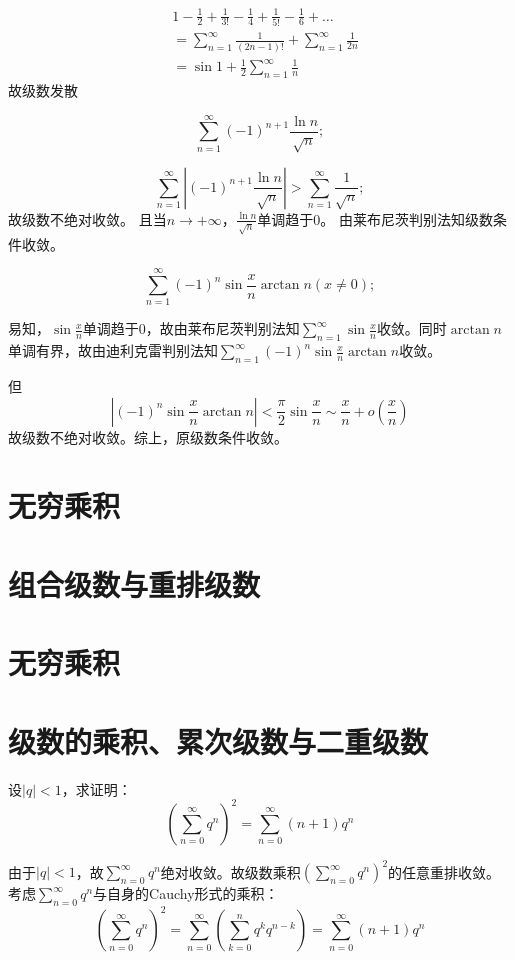 \begin{align*}
    & 1 - \frac{1}{2} + \frac{1}{3!} - \frac{1}{4} + \frac{1}{5!} -
    \frac{1}{6} + \dots
    \\
    & = \sum_{n=1}^{\infty} \frac{1}{(2n-1)!} + \sum_{n=1}^{\infty}
    \frac{1}{2n}
    \\ &= \sin 1 + \frac{1}{2} \sum_{n=1}^{\infty} \frac{1}{n}
\end{align*}
故级数发散

\[
    \sum_{n=1}^{\infty} (-1)^{n+1} \frac{\ln n}{\sqrt{n}};
\]

\[
    \sum_{n=1}^{\infty} \left| (-1)^{n+1} \frac{\ln
    n}{\sqrt{n}} \right|
    > \sum_{n=1}^{\infty} \frac{1}{\sqrt{n}} ;
\]
故级数不绝对收敛。
且当\(n \to + \infty\)，\(\frac{\ln n}{\sqrt{n}}\)单调趋于0。
由莱布尼茨判别法知级数条件收敛。

\[
    \sum_{n=1}^{\infty} (-1)^n \sin \frac{x}{n} \arctan n (x \neq 0);
\]

易知，\(\sin \frac{x}{n}\)单调趋于0，故由莱布尼茨判别法知\(\sum_{n=1}^{\infty} \sin
\frac{x}{n}\)收敛。同时\(\arctan n\)单调有界，故由迪利克雷判别法知\(\sum_{n=1}^{\infty}
(-1)^{n} \sin \frac{x}{n} \arctan n\)收敛。

但\[
    \left| (-1)^{n}\sin \frac{x}{n} \arctan n \right| < \frac{\pi}{2}
    \sin \frac{x}{n} \sim \frac{x}{n} + o(\frac{x}{n})
\]
故级数不绝对收敛。综上，原级数条件收敛。

\section{无穷乘积}
\section{组合级数与重排级数}
\section{无穷乘积}
\section{级数的乘积、累次级数与二重级数}
\begin{problem}
    设\(\left\vert q \right\vert < 1\)，求证明：
    \[
        \left( \sum_{n=0}^{\infty} q^{n} \right)^2
        =\sum_{n=0}^{\infty} (n + 1) q^{n}
    \]
\end{problem}
\begin{solution}
    由于\(\left\vert q \right\vert < 1\)，故\(\sum_{n=0}^{\infty}
    q^{n}\)绝对收敛。故级数乘积\(\left( \sum_{n=0}^{\infty} q^{n}
    \right)^2\)的任意重排收敛。
    考虑\(\sum_{n=0}^{\infty} q^{n}\)与自身的Cauchy形式的乘积：
    \[
        \left( \sum_{n=0}^{\infty} q^{n} \right)^2
        =\sum_{n=0}^{\infty} \left( \sum_{k=0}^{n} q^{k}
        q^{n-k} \right)
        =\sum_{n=0}^{\infty} (n + 1) q^{n}
    \]
\end{solution}

